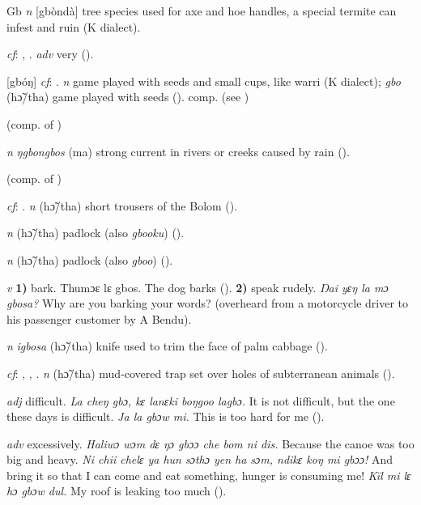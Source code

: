 \begin{letter}{Gb}
 \textit{n} [gbòndà] tree species used for axe and hoe handles, a special termite can infest and ruin (K dialect).

 \textit{cf}: , . \textit{adv} very (\citealt{Sumner1921}). 

 [gbóŋ] \textit{cf}: . \textit{n} game played with seeds and small cups, like warri (K dialect); \textit{gbo} (hɔ̃/tha) game played with seeds (\citealt{Pichl1967}). comp.  (see ) 

 (comp. of ) 

 \textit{n} \textit{ŋgbongbos} (ma) strong current in rivers or creeks caused by rain (\citealt{Pichl1967}). 

 (comp. of ) 

 \textit{cf}: . \textit{n} (hɔ̃/tha) short trousers of the Bolom (\citealt{Pichl1967}).

 \textit{n} (hɔ̃/tha) padlock (also \textit{gbooku}) (\citealt{Pichl1967}).

 \textit{n} (hɔ̃/tha) padlock (also \textit{gboo}) (\citealt{Pichl1967}).

 \textit{v} \textbf{1)} bark. Thumɔɛ lɛ gbos. The dog barks (\citealt{Pichl1967}). \textbf{2)} speak rudely. \textit{Ŋai yɛŋ la mɔ gbosa?} Why are you barking your words? (overheard from a motorcycle driver to his passenger customer by A Bendu). 

 \textit{n} \textit{igbosa} (hɔ̃/tha) knife used to trim the face of palm cabbage (\citealt{Pichl1967}).

 \textit{cf}: , , . \textit{n} (hɔ̃/tha) mud-covered trap set over holes of subterranean animals (\citealt{Pichl1967}).

 \textit{adj} difficult. \textit{La cheŋ gbɔ, kɛ lanɛki boŋgoo lagbɔ.} It is not difficult, but the one these days is difficult. \textit{Ja la gbɔw mi.} This is too hard for me (\citealt{Pichl1967}). 

 \textit{adv} excessively. \textit{Haliwɔ wɔm dɛ ŋɔ gbɔɔ che bom ni dis.} Because the canoe was too big and heavy. \textit{Ni chii chelɛ ya hun sɔthɔ yen ha sɔm, ndikɛ koŋ mi gbɔɔ!} And bring it so that I can come and eat something, hunger is consuming me! \textit{Kïl mi lɛ hɔ gbɔw dul.} My roof is leaking too much (\citealt{Pichl1967}). 


\end{letter}
